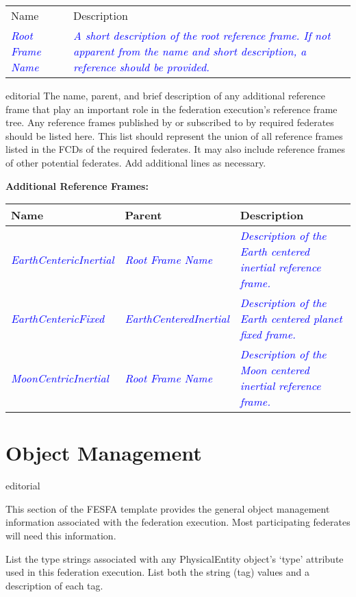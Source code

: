 \documentclass[11pt,english,letterpaper]{article}
\newcommand{\example}[1]{{\textcolor{blue}{\textit{#1}}}}
\begin{document}
\begin{tabularx}{\textwidth}{lX}
Name & Description \\
\example{Root Frame Name} &
\example{A short description of the root reference frame.  If not apparent from
the name and short description, a reference should be provided.\cite{vallado2001}}
\end{tabularx}

\begin{shownto}{editorial}
{\color{red} The name, parent, and brief description of any additional reference
frame that play an important role in the federation execution's reference frame
tree. Any reference frames published by or subscribed to by required federates
should be listed here. This list should represent the union of all reference
frames listed in the FCDs of the required federates. It may also include
reference frames of other potential federates. Add additional lines as
necessary.}
\end{shownto}

\textbf{Additional Reference Frames: }

\begin{tabularx}{\textwidth}{|l|l|X|} \hline
Name & Parent & Description \\ \hline
\example{EarthCentericInertial} &
\example{Root Frame Name} &
\example{Description of the Earth centered inertial reference frame.} \\ \hline
\example{EarthCentericFixed} &
\example{EarthCenteredInertial} &
\example{Description of the Earth centered planet fixed frame.} \\ \hline
\example{MoonCentricInertial} &
\example{Root Frame Name} &
\example{Description of the Moon centered inertial reference frame.} \\ \hline
\end{tabularx}

\section*{Object Management}

\begin{shownto}{editorial}
{\color{red} This section of the FESFA template provides the general object
management information associated with the federation execution. Most
participating federates will need this information.

List the type strings associated with any PhysicalEntity object's `type'
attribute used in this federation execution. List both the string (tag) values
and a description of each tag.}
\end{shownto}
\end{document}
